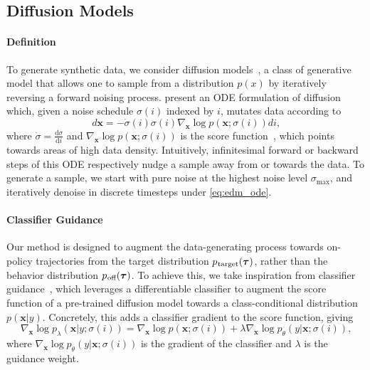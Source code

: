 \documentclass[10pt]{article} %
\theoremstyle{plain}
\theoremstyle{definition}
\theoremstyle{remark}
\newcommand{\ptarg}{p_{\mkern1mu\text{target}}}
\newcommand{\poff}{p_{\mkern1mu\text{off}}}
\begin{document}
\subsection{Diffusion Models}
\label{sec:diffusion-models}


\paragraph{Definition}
To generate synthetic data, we consider diffusion models~\citep{pmlr-v37-sohl-dickstein15, ddpm}, a class of generative model that allows one to sample from a distribution $p(x)$ by iteratively reversing a forward noising process.
\citet{karras2022elucidating} present an ODE formulation of diffusion which, given a noise schedule $\sigma(i)$ indexed by $i$, mutates data according to
\begin{equation}
    \label{eq:edm_ode} d\bm{x} = -\dot{\sigma}(i)\sigma(i)\nabla_{\bm{x}} \log p\left(\bm{x}; \sigma(i) \right) di\text{,}
\end{equation}
where \mbox{$\dot{\sigma} = \frac{\mathrm{d}\sigma}{\mathrm{d}i}$} and $\nabla_{\bm{x}} \log p\left(\bm{x}; \sigma(i)\right)$ is the score function~\citep{hyvarinen2005estimation}, which points towards areas of high data density.
Intuitively, infinitesimal forward or backward steps of this ODE respectively nudge a sample away from or towards the data.
To generate a sample, we start with pure noise at the highest noise level $\sigma_{\textrm{max}}$, and iteratively denoise in discrete timesteps under \autoref{eq:edm_ode}.


\paragraph{Classifier Guidance}
Our method is designed to augment the data-generating process towards on-policy trajectories from the target distribution $\ptarg(\bm{\tau})$, rather than the behavior distribution $\poff(\bm{\tau})$.
To achieve this, we take inspiration from classifier guidance~\citep{dhariwal2021diffusion}, which leverages a differentiable classifier to augment the score function of a pre-trained diffusion model towards a class-conditional distribution $p(\bm{x}|y)$.
Concretely, this adds a classifier gradient to the score function, giving
\begin{equation}
    \nabla_{\bm{x}}\log p_{\lambda}\left(\bm{x} | y; \sigma(i) \right) = \nabla_{\bm{x}}\log p\left(\bm{x}; \sigma(i) \right) + \lambda \nabla_{\bm{x}}\log p_\theta\left(y | \bm{x} ; \sigma(i) \right) \text{,}
\end{equation}
where $\nabla_{\bm{x}}\log p_\theta\left(y | \bm{x} ; \sigma(i) \right)$ is the gradient of the classifier and $\lambda$ is the guidance weight.
\end{document}
